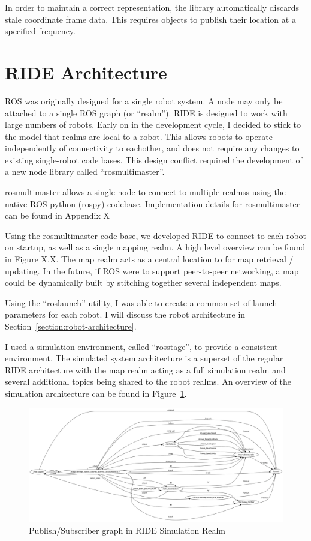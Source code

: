 In order to maintain a correct representation, the library automatically discards stale coordinate frame data. This requires objects to publish their location at a specified frequency. 

\section{RIDE Architecture}

ROS was originally designed for a single robot system. A node may only be attached to a single ROS graph (or ``realm''). RIDE is designed to work with large numbers of robots. Early on in the development cycle, I decided to stick to the model that realms are local to a robot. This allows robots to operate independently of connectivity to eachother, and does not require any changes to existing single-robot code bases. This design conflict required the development of a new node library called ``rosmultimaster''.

rosmultimaster allows a single node to connect to multiple realmss using the native ROS python (rospy) codebase. Implementation details for rosmultimaster can be found in Appendix X %

Using the rosmultimaster code-base, we developed RIDE to connect to each robot on startup, as well as a single mapping realm. A high level overview can be found in Figure X.X. The map realm acts as a central location to for map retrieval / updating. In the future, if ROS were to support peer-to-peer networking, a map could be dynamically built by stitching together several independent maps. 

Using the ``roslaunch'' utility, I was able to create a common set of launch parameters for each robot. I will discuss the robot architecture in Section~\ref{section:robot-architecture}.

I used a simulation environment, called ``rosstage'', to provide a consistent environment. The simulated system architecture is a superset of the regular RIDE architecture with the map realm acting as a full simulation realm and several additional topics being shared to the robot realms. An overview of the simulation architecture can be found in Figure~\ref{fig:ride-simulation-realm}.

\begin{figure}[ht]
\includegraphics[width=\textwidth]{images/ride-simulation-realm.png}
\caption{Publish/Subscriber graph in RIDE Simulation Realm\label{fig:ride-simulation-realm}}
\end{figure}

